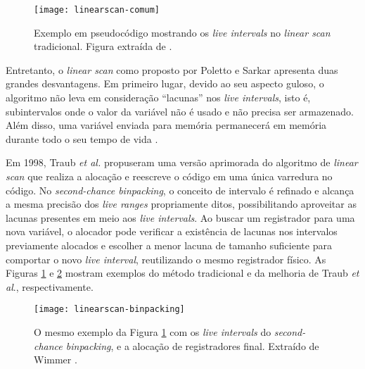 \documentclass[
	12pt,				%
	openright,			%
	oneside,			%
	a4paper,			%
	tccpreliminar,			%
	]{ABNT-DC-UEL}
\begin{document}
\begin{figure}[hb]
    \centering
    \texttt{[image: linearscan-comum]}
    \caption{Exemplo em pseudocódigo mostrando os \textit{live intervals} no \textit{linear scan} tradicional. Figura extraída de \cite{wimmer:04}.}
    \label{fig:liveintervals-normal}
\end{figure}

Entretanto, o \textit{linear scan} como proposto por Poletto e Sarkar apresenta duas grandes desvantagens. Em primeiro lugar, devido ao seu aspecto guloso, o algoritmo não leva em consideração ``lacunas'' nos \textit{live intervals}, isto é, subintervalos onde o valor da variável não é usado e não precisa ser armazenado. Além disso, uma variável enviada para memória permanecerá em memória durante todo o seu tempo de vida \cite{eisl:16}.

Em 1998, Traub \textit{et al.} \cite{traub:98} propuseram uma versão aprimorada do algoritmo de \textit{linear scan} que realiza a alocação e reescreve o código em uma única varredura no código. No \textit{second-chance binpacking}, o conceito de intervalo é refinado e alcança a mesma precisão dos \textit{live ranges} propriamente ditos, possibilitando aproveitar as lacunas presentes em meio aos \textit{live intervals}. Ao buscar um registrador para uma nova variável, o alocador pode verificar a existência de lacunas nos intervalos previamente alocados e escolher a menor lacuna de tamanho suficiente para comportar o novo \textit{live interval}, reutilizando o mesmo registrador físico. As Figuras \ref{fig:liveintervals-normal} e \ref{fig:liveintervals-binpacking} mostram exemplos do método tradicional e da melhoria de Traub \textit{et al}., respectivamente.

\begin{figure}
    \centering
    \texttt{[image: linearscan-binpacking]}
    \caption{O mesmo exemplo da Figura \ref{fig:liveintervals-normal} com os \textit{live intervals} do \textit{second-chance binpacking}, e a alocação de registradores final. Extraído de Wimmer \cite{wimmer:04}.}
    \label{fig:liveintervals-binpacking}
\end{figure}
\end{document}
